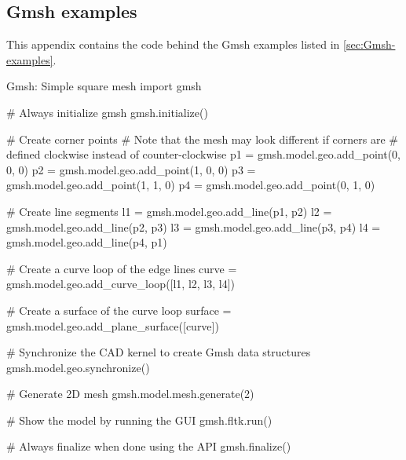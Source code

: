 \subsection{Gmsh examples}
\label{app:Gmsh-examples}
This appendix contains the code behind the Gmsh examples listed in \autoref{sec:Gmsh-examples}.

\begin{python}[label=py:Gmshgrid, breakable]{Gmsh: Simple square mesh}
import gmsh

# Always initialize gmsh
gmsh.initialize()

# Create corner points
# Note that the mesh may look different if corners are
# defined clockwise instead of counter-clockwise
p1 = gmsh.model.geo.add_point(0, 0, 0)
p2 = gmsh.model.geo.add_point(1, 0, 0)
p3 = gmsh.model.geo.add_point(1, 1, 0)
p4 = gmsh.model.geo.add_point(0, 1, 0)

# Create line segments
l1 = gmsh.model.geo.add_line(p1, p2)
l2 = gmsh.model.geo.add_line(p2, p3)
l3 = gmsh.model.geo.add_line(p3, p4)
l4 = gmsh.model.geo.add_line(p4, p1)

# Create a curve loop of the edge lines
curve = gmsh.model.geo.add_curve_loop([l1, l2, l3, l4])

# Create a surface of the curve loop
surface = gmsh.model.geo.add_plane_surface([curve])

# Synchronize the CAD kernel to create Gmsh data structures
gmsh.model.geo.synchronize()

# Generate 2D mesh
gmsh.model.mesh.generate(2)

# Show the model by running the GUI
gmsh.fltk.run()

# Always finalize when done using the API
gmsh.finalize()
\end{python}



